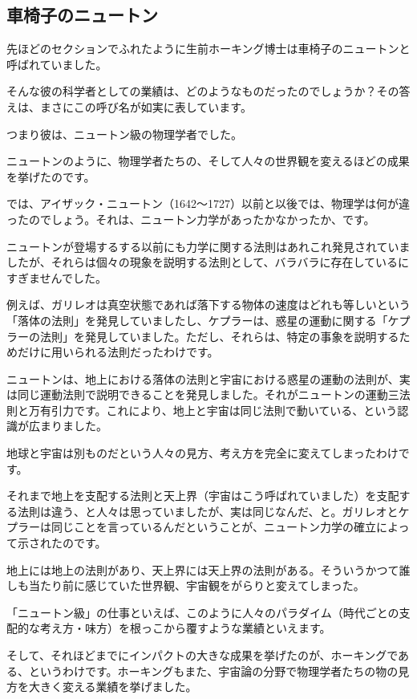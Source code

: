 \documentclass[10pt,b5paper,papersize,dvipdfmx]{jsbook}
\begin{document}
\subsection{車椅子のニュートン}
先ほどのセクションでふれたように生前ホーキング博士は車椅子のニュートンと呼ばれていました。\par
そんな彼の科学者としての業績は、どのようなものだったのでしょうか？その答えは、まさにこの呼び名が如実に表しています。\par
つまり彼は、ニュートン級の物理学者でした。\par
ニュートンのように、物理学者たちの、そして人々の世界観を変えるほどの成果を挙げたのです。\par
では、アイザック・ニュートン（1642～1727）以前と以後では、物理学は何が違ったのでしょう。それは、ニュートン力学があったかなかったか、です。\par
ニュートンが登場するする以前にも力学に関する法則はあれこれ発見されていましたが、それらは個々の現象を説明する法則として、バラバラに存在しているにすぎませんでした。\par
例えば、ガリレオは真空状態であれば落下する物体の速度はどれも等しいという「落体の法則」を発見していましたし、ケプラーは、惑星の運動に関する「ケプラーの法則」を発見していました。ただし、それらは、特定の事象を説明するためだけに用いられる法則だったわけです。\par
ニュートンは、地上における落体の法則と宇宙における惑星の運動の法則が、実は同じ運動法則で説明できることを発見しました。それがニュートンの運動三法則と万有引力です。これにより、地上と宇宙は同じ法則で動いている、という認識が広まりました。\par
地球と宇宙は別ものだという人々の見方、考え方を完全に変えてしまったわけです。\par
それまで地上を支配する法則と天上界（宇宙はこう呼ばれていました）を支配する法則は違う、と人々は思っていましたが、実は同じなんだ、と。ガリレオとケプラーは同じことを言っているんだということが、ニュートン力学の確立によって示されたのです。\par
地上には地上の法則があり、天上界には天上界の法則がある。そういうかつて誰しも当たり前に感じていた世界観、宇宙観をがらりと変えてしまった。\par
「ニュートン級」の仕事といえば、このように人々のパラダイム（時代ごとの支配的な考え方・味方）を根っこから覆すような業績といえます。\par
そして、それほどまでにインパクトの大きな成果を挙げたのが、ホーキングである、というわけです。ホーキングもまた、宇宙論の分野で物理学者たちの物の見方を大きく変える業績を挙げました。\par
\end{document}
